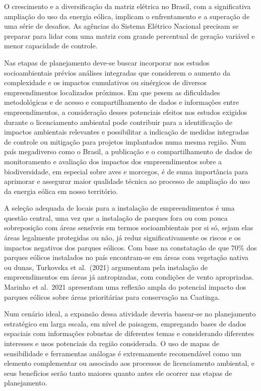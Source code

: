 \documentclass[
  oneside]{scrbook}
\begin{document}
O crescimento e a diversificação da matriz elétrica no Brasil, com a significativa ampliação do uso da energia eólica, implicam o enfrentamento e a superação de uma série de desafios. As agências do Sistema Elétrico Nacional precisam se preparar para lidar com uma matriz com grande percentual de geração variável e menor capacidade de controle.

Nas etapas de planejamento deve-se buscar incorporar nos estudos socioambientais prévios análises integradas que considerem o aumento da complexidade e os impactos cumulativos ou sinérgicos de diversos empreendimentos localizados próximos. Em que pesem as dificuldades metodológicas e de acesso e compartilhamento de dados e informações entre empreendimentos, a consideração desses potenciais efeitos nos estudos exigidos durante o licenciamento ambiental pode contribuir para a identificação de impactos ambientais relevantes e possibilitar a indicação de medidas integradas de controle ou mitigação para projetos implantados numa mesma região. Num país megadiverso como o Brasil, a publicação e o compartilhamento de dados de monitoramento e avaliação dos impactos dos empreendimentos sobre a biodiversidade, em especial sobre aves e morcegos, é de suma importância para aprimorar e assegurar maior qualidade técnica ao processo de ampliação do uso da energia eólica em nosso território.

A seleção adequada de locais para a instalação de empreendimentos é uma questão central, uma vez que a instalação de parques fora ou com pouca sobreposição com áreas sensíveis em termos socioambientais por si só, sejam elas áreas legalmente protegidas ou não, já reduz significativamente os riscos e os impactos negativos dos parques eólicos. Com base na constatação de que 70\% dos parques eólicos instalados no país encontram-se em áreas com vegetação nativa ou dunas, Turkovska et al.~(2021) argumentam pela instalação de empreendimentos em áreas já antropizadas, com condições de vento apropriadas. Marinho et al.~2021 apresentam uma reflexão ampla do potencial impacto dos parques eólicos sobre áreas prioritárias para conservação na Caatinga.

Num cenário ideal, a expansão dessa atividade deveria basear-se no planejamento estratégico em larga escala, em nível de paisagem, empregando bases de dados espaciais com informações robustas de diferentes temas e considerando diferentes interesses e usos potenciais da região considerada. O uso de mapas de sensibilidade e ferramentas análogas é extremamente recomendável como um elemento complementar ou associado aos processos de licenciamento ambiental, e seus benefícios serão tanto maiores quanto antes ele ocorrer nas etapas de planejamento.
\end{document}
